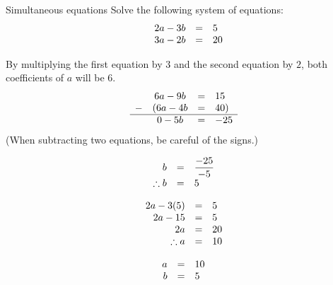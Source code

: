 \begin{wex}
{Simultaneous equations }
{
Solve the following system of equations:
\begin{equation*}
\begin{array}{cccc}\hfill & 2a - 3b& =& 5\hfill \\ 
\hfill& 3a-2b& =& 20\hfill 
\end{array}
\end{equation*}
}
{
By multiplying the first equation by $3$ and the second equation by $2$, both coefficients of $a$ will be $6$.
\begin{equation*}
\begin{array}{cccc}\hfill & 6a-9b& =& 15\hfill \\ 
\hfill- & (6a-4b& =& 40)\hfill \\ \hline
 \hfill & 0 - 5b &=& -25 

\end{array}
\end{equation*}
(When subtracting two equations, be careful of the signs.)

\begin{equation*}
    \begin{array}{ccl}
 \hfill b &=& \dfrac{-25}{-5} \\
 \hfill \therefore b &=& 5
    \end{array}
\end{equation*}

\begin{equation*}
    \begin{array}{ccl}\hfill 2a - 3(5)&=& 5\\
	\hfill 2a-15 & =& 5\\
	\hfill 2a & =& 20\\
	\hfill \therefore a & =& 10 
   \end{array}
\end{equation*}


\begin{equation*}
\begin{array}{ccc}
 \hfill a& =& 10\hfill \\
\hfill b& =& 5\hfill 
\end{array}
\end{equation*}
}
\end{wex}


